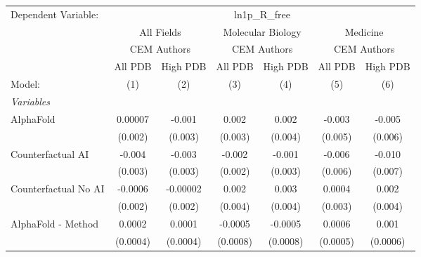 \begingroup
\centering
\begin{tabular}{lcccccc}
   \tabularnewline \midrule \midrule
   Dependent Variable: & \multicolumn{6}{c}{ln1p\_R\_free}\\
 & \multicolumn{2}{c}{All Fields} & \multicolumn{2}{c}{Molecular Biology} & \multicolumn{2}{c}{Medicine} \\
\cmidrule(lr){2-3} \cmidrule(lr){4-5} \cmidrule(lr){6-7}
 & \multicolumn{2}{c}{CEM Authors} & \multicolumn{2}{c}{CEM Authors} & \multicolumn{2}{c}{CEM Authors} \\
\cmidrule(lr){2-3} \cmidrule(lr){4-5} \cmidrule(lr){6-7}
 & \multicolumn{1}{c}{All PDB} & \multicolumn{1}{c}{High PDB} & \multicolumn{1}{c}{All PDB} & \multicolumn{1}{c}{High PDB} & \multicolumn{1}{c}{All PDB} & \multicolumn{1}{c}{High PDB} \\
\cmidrule(lr){2-2} \cmidrule(lr){3-3} \cmidrule(lr){4-4} \cmidrule(lr){5-5} \cmidrule(lr){6-6} \cmidrule(lr){7-7}
   Model:                                                     & (1)             & (2)            & (3)      & (4)      & (5)            & (6)\\  
   \midrule
   \emph{Variables}\\
   AlphaFold                                                  & 0.00007         & -0.001         & 0.002    & 0.002    & -0.003         & -0.005\\   
                                                              & (0.002)         & (0.003)        & (0.003)  & (0.004)  & (0.005)        & (0.006)\\   
   Counterfactual AI                                          & -0.004          & -0.003         & -0.002   & -0.001   & -0.006         & -0.010\\   
                                                              & (0.003)         & (0.003)        & (0.002)  & (0.003)  & (0.006)        & (0.007)\\   
   Counterfactual No AI                                       & -0.0006         & -0.00002       & 0.002    & 0.003    & 0.0004         & 0.002\\   
                                                              & (0.002)         & (0.002)        & (0.004)  & (0.004)  & (0.003)        & (0.004)\\   
   AlphaFold - Method                                         & 0.0002          & 0.0001         & -0.0005  & -0.0005  & 0.0006         & 0.001\\   
                                                              & (0.0004)        & (0.0004)       & (0.0008) & (0.0008) & (0.0005)       & (0.0006)\\   

\end{tabular}
